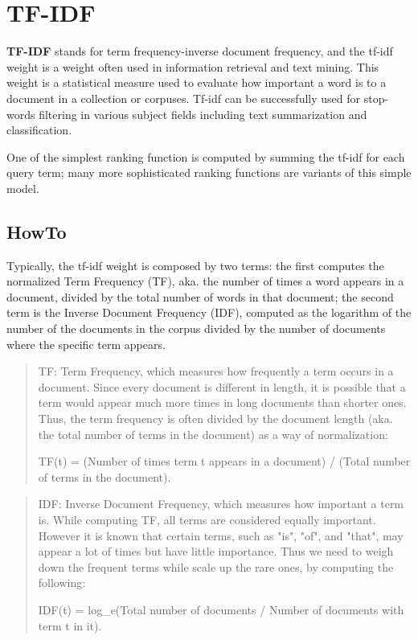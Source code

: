 \section{TF-IDF}

{\bf TF-IDF} stands for term frequency-inverse document frequency, and the
tf-idf weight is a weight often used in information retrieval and text mining.
This weight is a statistical measure used to evaluate how important a word is
to a document in a collection or corpuses. Tf-idf can be successfully used for
stop-words filtering in various subject fields including text summarization and
classification.

One of the simplest ranking function is computed by summing the tf-idf for each
query term; many more sophisticated ranking functions are variants of this
simple model.

\subsection{HowTo}

Typically, the tf-idf weight is composed by two terms: the first computes the
normalized Term Frequency (TF), aka. the number of times a word appears in a
document, divided by the total number of words in that document; the second
term is the Inverse Document Frequency (IDF), computed as the logarithm of the
number of the documents in the corpus divided by the number of documents where
the specific term appears. 

\begin{quote}
TF: Term Frequency, which measures how frequently a term occurs in a
document. Since every document is different in length, it is possible that a
term would appear much more times in long documents than shorter ones. Thus,
the term frequency is often divided by the document length (aka. the total
number of terms in the document) as a way of normalization:

TF(t) = (Number of times term t appears in a document) / (Total number of terms
in the document).
\end{quote}

\begin{quote}
IDF: Inverse Document Frequency, which measures how important a term is. While
computing TF, all terms are considered equally important. However it is known
that certain terms, such as "is", "of", and "that", may appear a lot of times
but have little importance. Thus we need to weigh down the frequent terms while
scale up the rare ones, by computing the following:

IDF(t) = log\_e(Total number of documents / Number of documents with term t in it).
\end{quote}

